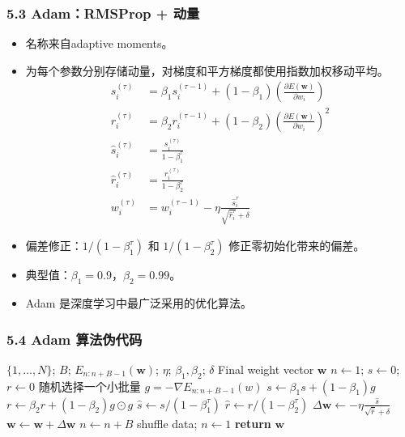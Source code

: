 \documentclass[t,aspectratio=169]{beamer} %
\begin{document}
\begin{frame}[allowframebreaks]
    \frametitle{5.3 Adam：RMSProp + 动量}
    \begin{itemize}
        \item 名称来自\alert{adaptive moments}。
        \item 为每个参数\alert{分别存储动量}，对梯度和平方梯度都使用指数加权移动平均。
        \begin{align}
        s_i^{(\tau)} &= \beta_1 s_i^{(\tau-1)} + (1 - \beta_1) \left(\frac{\partial E(\mathbf{w})}{\partial w_i}\right) \tag{7.43} \\
        r_i^{(\tau)} &= \beta_2 r_i^{(\tau-1)} + (1 - \beta_2) \left(\frac{\partial E(\mathbf{w})}{\partial w_i}\right)^2 \tag{7.44} \\
        \widehat{s}_i^{(\tau)} &= \frac{s_i^{(\tau)}}{1 - \beta_1^\tau} \tag{7.45} \\
        \widehat{r}_i^{(\tau)} &= \frac{r_i^{(\tau)}}{1 - \beta_2^\tau} \tag{7.46} \\
        w_i^{(\tau)} &= w_i^{(\tau-1)} - \eta \frac{\widehat{s}_i^{\tau}}{\sqrt{\widehat{r}_i^{\tau}} + \delta} \tag{7.47}
        \end{align}
        \item 偏差修正：$1/(1-\beta_1^\tau)$ 和 $1/(1-\beta_2^\tau)$ 修正零初始化带来的偏差。
        \item 典型值：$\beta_1 = 0.9$，$\beta_2 = 0.99$。
        \item Adam 是深度学习中最广泛采用的优化算法。
    \end{itemize}
\end{frame}

\begin{frame}[shrink=28]
    \frametitle{5.4 Adam 算法伪代码}
    \footnotesize
    \begin{algorithm}[H]
    \caption{Adam optimization}
    \begin{algorithmic}
    \Input $\{1,\dots,N\}$; $B$; $E_{n:n+B-1}(\mathbf{w})$; $\eta$; $\beta_1, \beta_2$; $\delta$
    \Output Final weight vector $\mathbf{w}$
    \State $n \leftarrow 1$; $s \leftarrow 0$; $r \leftarrow 0$
    \Repeat
      \State 随机选择一个小批量
      \State $g=-\nabla E_{n:n+B-1}(w)$
      \State $s\leftarrow \beta_1s + (1-\beta_1)g$
      \State $r\leftarrow \beta_2r + (1-\beta_2)g\odot g$
      \State $\hat{s}\leftarrow s/(1-\beta_1^\tau)$
      \State $\hat{r}\leftarrow r/(1-\beta_2^\tau)$
      \State $\Delta \mathbf{w} \leftarrow -\eta \frac{\hat{s}}{\sqrt{\hat{r}}+\delta}$
      \State $\mathbf{w}\leftarrow \mathbf{w} + \Delta \mathbf{w}$
      \State $n \leftarrow n + B$
        \State shuffle data; $n \gets 1$
      \EndIf
    \State \textbf{return} $\mathbf{w}$
    \end{algorithmic}
    \end{algorithm}
\end{frame}
\end{document}
